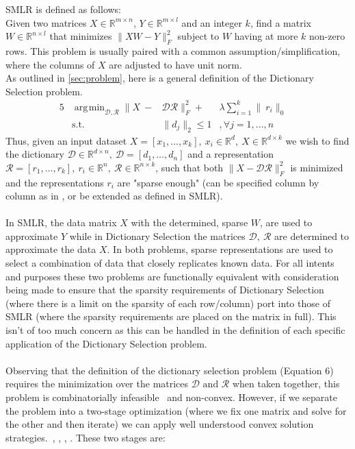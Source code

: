 \documentclass{article}
\newcommand{\R}{\mathbb{R}}
\newcommand{\Rr}{\mathcal{R}}
\newcommand{\D}{\mathcal{D}}
\DeclareMathOperator*{\argmin}{\arg\!\min}
\begin{document}
\noindent SMLR is defined as follows:\\
Given two matrices $X\in\R^{m\times n}$, $Y\in\R^{m\times l}$ and an integer $k$, find a matrix  $W\in\R^{n\times l}$ that minimizes $\|XW-Y\|^2_F$ subject to $W$ having at more $k$ non-zero rows. This problem is usually paired with a common assumption/simplification, where the columns of $X$ are adjusted to have unit norm.
\\

\noindent As outlined in \autoref{sec:problem}, here is a general definition of the Dictionary Selection problem.
\begin{alignat}{5}
         & \argmin_{\D, \Rr} \|X \ -&\D\Rr\|_F^2  + &\lambda \sum_{i=1}^k  \|\ r_i\|_0     \quad   \\
         &\text{s.t.}  \quad  &\|d_j\|_2 \leq 1&, \forall j=1, ...,n  \quad 
\end{alignat}
Thus, given an input dataset $X=[x_1, \dots, x_k], \ x_i\in\R^d, \ X\in\R^{d\times k}$ we wish to find the dictionary $\D\in\R^{d\times n}, \ \D = [d_1, \dots, d_n]$ and a representation $\Rr=[r_1,\dots,r_k], \ r_i\in\R^n, \ \Rr\in\R^{n\times k}$, such that both $\|X-\D\Rr\|_F^2$ is minimized and the representations $r_i$ are "sparse enough" (can be specified column by column as in \cite{rIBP}, or be extended as defined in SMLR).\\
\\
\noindent In SMLR, the data matrix $X$ with the determined, sparse $W$, are used to approximate $Y$ while in Dictionary Selection the matrices $\D,\ \Rr$ are determined to approximate the data $X$. In both problems, sparse representations are used to select a combination of data that closely replicates known data. For all intents and purposes these two problems are functionally equivalent with consideration being made to ensure that the sparsity requirements of Dictionary Selection (where there is a limit on the sparsity of each row/column) port into those of SMLR (where the sparsity requirements are placed on the matrix in full). This isn't of too much concern as this can be handled in the definition of each specific application of the Dictionary Selection problem.\\
\\
Observing that the definition of the dictionary selection problem (Equation 6) requires the minimization over the matrices $\D\text{ and }\Rr$ when taken together, this problem is combinatorially infeasible~\cite{NPHardproof} and non-convex. However, if we separate the problem into a two-stage optimization (where we fix one matrix and solve for the other and then iterate) we can apply well understood convex solution strategies.~\cite{submod_spectral}, \cite{greedy_selection}, \cite{rIBP}, \cite{Singer16TwoStage}. These two stages are: 
\end{document}
